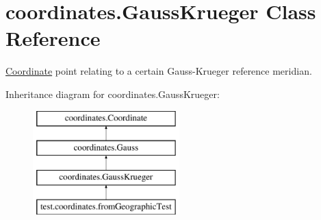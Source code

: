 \hypertarget{classcoordinates_1_1_gauss_krueger}{}\section{coordinates.\+Gauss\+Krueger Class Reference}
\label{classcoordinates_1_1_gauss_krueger}


\hyperlink{classcoordinates_1_1_coordinate}{Coordinate} point relating to a certain Gauss-\/\+Krueger reference meridian.  


Inheritance diagram for coordinates.\+Gauss\+Krueger\+:\begin{figure}[H]
\begin{center}
\leavevmode
\includegraphics[height=4.000000cm]{classcoordinates_1_1_gauss_krueger}
\end{center}
\end{figure}
